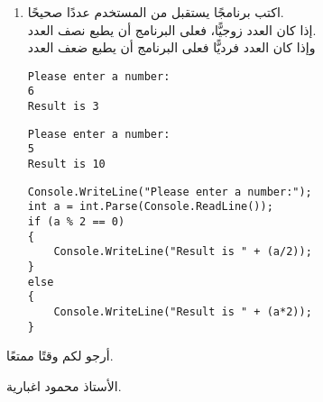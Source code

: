 ﻿\documentclass[12pt]{article}
\begin{document}
\begin{enumerate}
\clearpage
    \item اكتب برنامجًا يستقبل من المستخدم عددًا صحيحًا. \\
    إذا كان العدد زوجيًّا، فعلى البرنامج أن يطبع نصف العدد. \\
    وإذا كان العدد فرديًّا فعلى البرنامج أن يطبع ضعف العدد
    \ifdetailed
    \begin{boxExample}[1]
        \begin{english}
            \begin{verbatim}
Please enter a number:
6
Result is 3
\end{verbatim}
\end{english}
\end{boxExample}
    \begin{boxExample}[2]
        \begin{english}
            \begin{verbatim}
Please enter a number:
5
Result is 10
\end{verbatim}
\end{english}
\end{boxExample}
\ifwithsols
\begin{boxSolution}
    \begin{english}
    \begin{verbatim}
Console.WriteLine("Please enter a number:");
int a = int.Parse(Console.ReadLine());
if (a % 2 == 0)
{
    Console.WriteLine("Result is " + (a/2));
}
else
{
    Console.WriteLine("Result is " + (a*2));
}
    \end{verbatim}
\end{english}
\end{boxSolution}
\fi
\fi
\end{enumerate}


\vspace{1cm}
\begin{flushleft}
أرجو لكم وقتًا ممتعًا.

الأستاذ محمود اغبارية.
\end{flushleft}
\end{document}
